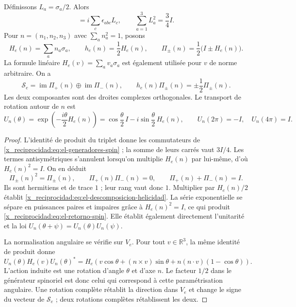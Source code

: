 \begin{proposition}
\label{x_reciprocidad:prop:el-helicidad}
Définissons \(L_a=\sigma_a/2\). Alors
\begin{equation}
 [L_a,L_b]=i\sum_c\epsilon_{abc}L_c,
 \qquad \sum_{a=1}^3L_a^2=\frac34 I.
 \label{x_reciprocidad:eq:el-generadores-spin}
\end{equation}
Pour \(n=(n_1,n_2,n_3)\) avec \(\sum_an_a^2=1\), posons
\[
 H_e(n)=\sum_an_a\sigma_a,\qquad
 h_e(n)=\frac12H_e(n),\qquad
 \Pi_\pm(n)=\frac12\bigl(I\pm H_e(n)\bigr).
\]
La formule linéaire \(H_e(v)=\sum_av_a\sigma_a\) est également utilisée
pour \(v\) de norme arbitraire.
On a
\begin{equation}
 \mathscr S_e=\operatorname{im}\Pi_+(n)
             \mathbin{\oplus}\operatorname{im}\Pi_-(n),
 \qquad
 h_e(n)\Pi_\pm(n)=\pm\frac12\Pi_\pm(n).
 \label{x_reciprocidad:eq:el-descomposicion-helicidad}
\end{equation}
Les deux composantes sont des droites complexes orthogonales. Le transport de
rotation autour de \(n\) est
\begin{equation}
 U_n(\theta)=\exp\!\left(-\frac{i\theta}{2}H_e(n)\right)
 =\cos\frac\theta2\,I-i\sin\frac\theta2\,H_e(n),
 \qquad
 U_n(2\pi)=-I,\quad U_n(4\pi)=I.
 \label{x_reciprocidad:eq:el-retorno-spin}
\end{equation}
\end{proposition}
\begin{proof}
L'identité de produit du triplet donne les commutateurs de
\eqref{x_reciprocidad:eq:el-generadores-spin} ; la somme de leurs carrés vaut \(3I/4\).
Les termes antisymétriques s'annulent lorsqu'on multiplie
\(H_e(n)\) par lui-même, d'où \(H_e(n)^2=I\).
On en déduit
\[
 \Pi_\pm(n)^2=\Pi_\pm(n),\qquad
 \Pi_+(n)\Pi_-(n)=0,\qquad \Pi_+(n)+\Pi_-(n)=I.
\]
Ils sont hermitiens et de trace \(1\) ; leur rang vaut donc \(1\).
Multiplier par \(H_e(n)/2\) établit
\eqref{x_reciprocidad:eq:el-descomposicion-helicidad}. La série exponentielle se
sépare en puissances paires et impaires grâce à \(H_e(n)^2=I\), ce qui
produit \eqref{x_reciprocidad:eq:el-retorno-spin}. Elle établit également directement
l'unitarité et la loi \(U_n(\theta+\psi)=U_n(\theta)U_n(\psi)\).

La normalisation angulaire se vérifie sur \(V_e\). Pour tout
\(v\in\mathbb R^3\), la même identité de produit donne
\[
 U_n(\theta)H_e(v)U_n(\theta)^*
 =H_e\!\left(v\cos\theta+(n\mathbin{\times}v)\sin\theta
       +n(n\mathbin{\cdot}v)(1-\cos\theta)\right).
\]
L'action induite est une rotation d'angle \(\theta\) et d'axe \(n\).
Le facteur \(1/2\) dans le générateur spinoriel est donc celui qui
correspond à cette paramétrisation angulaire. Une rotation complète rétablit
la direction dans \(V_e\) et change le signe du vecteur de
\(\mathscr S_e\) ; deux rotations complètes rétablissent les deux.
\end{proof}

